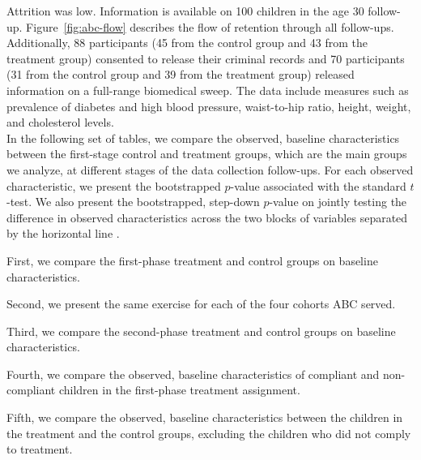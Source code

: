 \begin{appendices}
\noindent Attrition was low. Information is available on 100 children in the age 30 follow-up. Figure~\ref{fig:abc-flow} describes the flow of retention through all follow-ups. Additionally, 88 participants (45 from the control group and 43 from the treatment group) consented to release their criminal records and 70 participants (31 from the control group and 39 from the treatment group) released information on a full-range biomedical sweep. The data include measures such as prevalence of diabetes and high blood pressure, waist-to-hip ratio, height, weight, and cholesterol levels.\\ 

\noindent In the following set of tables, we compare the observed, baseline characteristics between the first-stage control and treatment groups, which are the main groups we analyze, at different stages of the data collection follow-ups. For each observed characteristic, we present the bootstrapped $p$-value associated with the standard $t$-test. We also present the bootstrapped, step-down $p$-value on jointly testing the difference in observed characteristics across the two blocks of variables separated by the horizontal line \citep{Lehmann_Romano_2005_testing}.

\noindent First, we compare the first-phase treatment and control groups on baseline characteristics. 



\noindent Second, we present the same exercise for each of the four cohorts ABC served.









\noindent Third, we compare the second-phase treatment and control groups on baseline characteristics. 



\noindent Fourth, we compare the observed, baseline characteristics of compliant and non-compliant children in the first-phase treatment assignment.



\noindent Fifth, we compare the observed, baseline characteristics between the children in the treatment and the control groups, excluding the children who did not comply to treatment.


\end{appendices}
